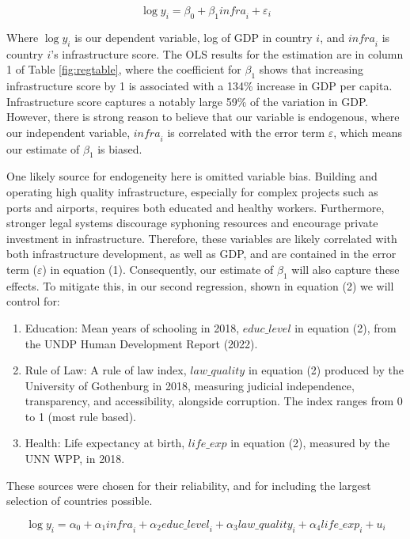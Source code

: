 \documentclass[12pt,a4paper]{article}
\begin{document}
\begin{equation}
  \log y_i = \beta_0 + \beta_1 \mathit{infra}_i + \varepsilon_i
\end{equation}

Where $\log y_i$ is our dependent variable, log of GDP in country $i$, and $\mathit{infra}_i$ is country $i$'s infrastructure score. The OLS results for the estimation are in column 1 of Table \ref{fig:regtable}, where the coefficient for $\beta_1$ shows that increasing infrastructure score by 1 is associated with a 134\% increase in GDP per capita. Infrastructure score captures a notably large 59\% of the variation in GDP. However, there is strong reason to believe that our variable is endogenous, where our independent variable, $\mathit{infra}_i$ is correlated with the error term $\varepsilon$, which means our estimate of $\beta_1$ is biased.

One likely source for endogeneity here is omitted variable bias. Building and operating high quality infrastructure, especially for complex projects such as ports and airports, requires both educated and healthy workers. Furthermore, stronger legal systems discourage syphoning resources and encourage private investment in infrastructure. Therefore, these variables are likely correlated with both infrastructure development, as well as GDP, and are contained in the error term ($\varepsilon$) in equation (1). Consequently, our estimate of $\beta_1$ will also capture these effects. To mitigate this, in our second regression, shown in equation (2) we will control for:

\begin{enumerate}[label=(\roman*)]
  \item Education: Mean years of schooling in 2018, $\mathit{educ\_level}$ in equation (2), from the UNDP Human Development Report (2022).
  \item Rule of Law: A rule of law index, $\mathit{law\_quality}$ in equation (2) produced by the University of Gothenburg in 2018, measuring judicial independence, transparency, and accessibility, alongside corruption. The index ranges from 0 to 1 (most rule based).
  \item Health: Life expectancy at birth, $\mathit{life\_exp}$ in equation (2), measured by the UNN WPP, in 2018.
\end{enumerate}

These sources were chosen for their reliability, and for including the largest selection of countries possible.

\begin{equation}
  \log y_i = \alpha_0 + \alpha_1 \mathit{infra}_i + \alpha_2 \mathit{educ\_level}_i + \alpha_3 \mathit{law\_quality}_i + \alpha_4 \mathit{life\_exp}_i + u_i
\end{equation}
\end{document}
